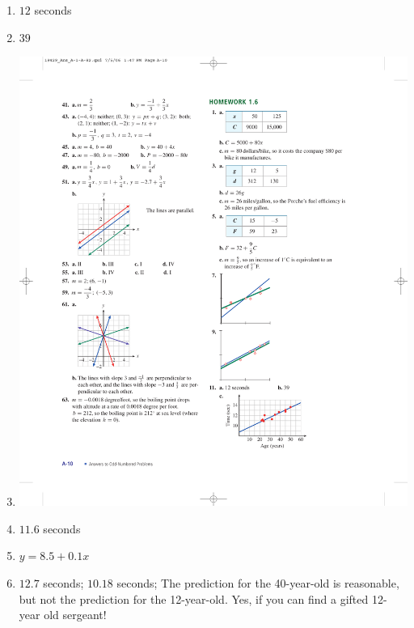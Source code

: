 \documentclass[10pt,]{book}
\theoremstyle{plain}
\theoremstyle{definition}
\theoremstyle{definition}
\theoremstyle{definition}
\theoremstyle{definition}
\numberwithin{equation}{part}
\begin{document}
\begin{exercisegroup}
\begin{multicols}{2}
\begin{enumerate}[label=*\alph**]
\item\hypertarget{li-1375}{}\(12\) seconds%
\item\hypertarget{li-1376}{}\(39\)%
\item\hypertarget{li-1377}{}\includegraphics[width=0.9\linewidth]{images/fig-ans-1-6-11}
%
\item\hypertarget{li-1378}{}\(11.6\) seconds%
\item\hypertarget{li-1379}{}\(y = 8.5 + 0.1x\)%
\item\hypertarget{li-1380}{}\(12.7\) seconds; \(10.18\) seconds; The prediction for the 40-year-old is reasonable, but not the prediction for the 12-year-old. Yes, if you can find a gifted 12-year old sergeant!%
\end{enumerate}
\end{multicols}
%

\end{exercisegroup}
\end{document}
